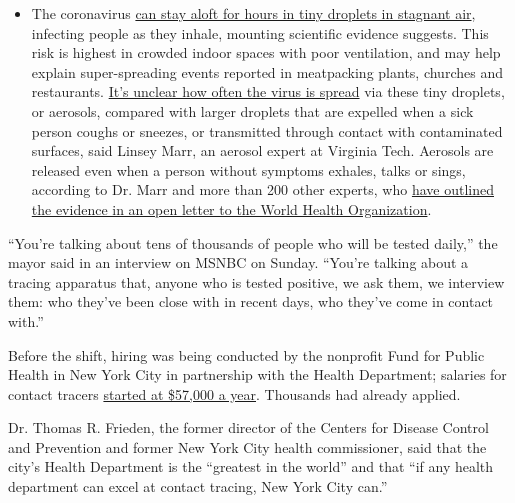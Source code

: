 \begin{itemize}
  \begin{itemize}
  \tightlist
  \item
    The coronavirus
    \href{https://www.nytimes.com/2020/07/04/health/239-experts-with-one-big-claim-the-coronavirus-is-airborne.html?action=click\&pgtype=Article\&state=default\&region=MAIN_CONTENT_3\&context=storylines_faq}{can
    stay aloft for hours in tiny droplets in stagnant air}, infecting
    people as they inhale, mounting scientific evidence suggests. This
    risk is highest in crowded indoor spaces with poor ventilation, and
    may help explain super-spreading events reported in meatpacking
    plants, churches and restaurants.
    \href{https://www.nytimes.com/2020/07/06/health/coronavirus-airborne-aerosols.html?action=click\&pgtype=Article\&state=default\&region=MAIN_CONTENT_3\&context=storylines_faq}{It's
    unclear how often the virus is spread} via these tiny droplets, or
    aerosols, compared with larger droplets that are expelled when a
    sick person coughs or sneezes, or transmitted through contact with
    contaminated surfaces, said Linsey Marr, an aerosol expert at
    Virginia Tech. Aerosols are released even when a person without
    symptoms exhales, talks or sings, according to Dr. Marr and more
    than 200 other experts, who
    \href{https://academic.oup.com/cid/article/doi/10.1093/cid/ciaa939/5867798}{have
    outlined the evidence in an open letter to the World Health
    Organization}.
  \end{itemize}
\end{itemize}

``You're talking about tens of thousands of people who will be tested
daily,'' the mayor said in an interview on MSNBC on Sunday. ``You're
talking about a tracing apparatus that, anyone who is tested positive,
we ask them, we interview them: who they've been close with in recent
days, who they've come in contact with.''

Before the shift, hiring was being conducted by the nonprofit Fund for
Public Health in New York City in partnership with the Health
Department; salaries for contact tracers
\href{https://web.archive.org/web/20200428080921/https://1w20ju1nsz1k2xqrjx3ccsd1-wpengine.netdna-ssl.com/wp-content/uploads/sites/76/2020/04/CT-I.pdf}{started
at \$57,000 a year}. Thousands had already applied.

Dr. Thomas R. Frieden, the former director of the Centers for Disease
Control and Prevention and former New York City health commissioner,
said that the city's Health Department is the ``greatest in the world''
and that ``if any health department can excel at contact tracing, New
York City can.''

